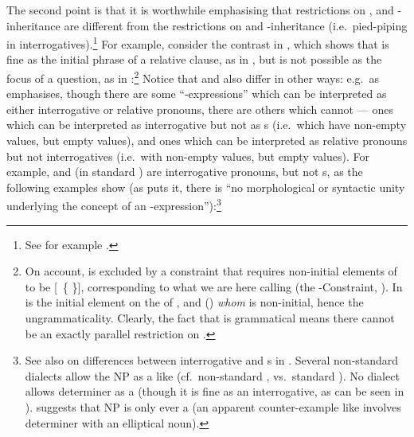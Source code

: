 \documentclass[output=paper
 	        ,biblatex
                ,babelshorthands
                ,newtxmath
                ,draftmode
                ,colorlinks, citecolor=brown
]{langscibook}
\begin{document}
The second point is that it is worthwhile emphasising that restrictions on , and
-inheritance are different from the restrictions on  and
-inheritance (i.e.\ pied-piping in interrogatives).\footnote{See for example
  .} For example, consider the contrast in ,
which shows that  is fine as the initial phrase of a relative
clause, as in , but is not possible as the focus of a question, as in
:\footnote{On  account,  is excluded
  by a constraint that requires non-initial elements of  to be
  [~\{ \}],  corresponding to what we are here calling  (the
  -Constraint, \citealt[189]{Ginzburg:Sag:00}). In   is
  the initial element on the  of ,
and () \emph{whom} is
  non-initial, hence the ungrammaticality. Clearly, the fact that  is
  grammatical means there cannot be an exactly parallel
  restriction on .}
\eal\label{x:rc-2930}
\zl
Notice that  and  also differ in other ways: e.g.\ as
\citet[490--493]{Sag:10b} emphasises, though there are some ``-expressions'' which
can be interpreted as either interrogative or relative pronouns, there are others which
cannot --- ones which can be interpreted as interrogative but not as s (i.e.\ which have non-empty  values, but empty  values),
and ones which can be interpreted as relative pronouns but not interrogatives (i.e.\ with
non-empty  values, but empty  values). For example,  and (in
standard )  are interrogative pronouns, but not s, as the following examples show (as \citealt[493]{Sag:10b} puts it, there is
``no morphological or syntactic unity underlying the concept of an 
-expression''):\footnote{See also  on differences between
  interrogative and s in . Several non-standard
   dialects allow the NP  as a  like 
  (cf.\ non-standard , vs.\ standard ). No dialect allows determiner  as a 
  (though it is fine as an interrogative, as can be seen in ). \citet[491,
  note 10]{Sag:10b} suggests that NP  is only ever a  (an
  apparent counter-example like   involves determiner 
  with an elliptical noun).}
\end{document}
